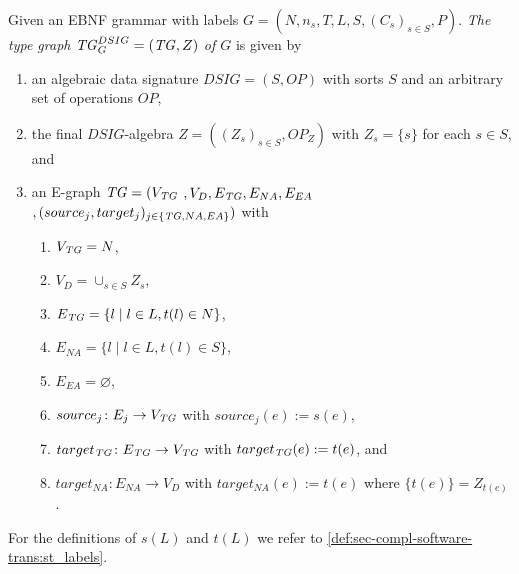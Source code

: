\begin{definition}
\label{def:sec-compl-software-trans:ebnf_typegraph}
Given an EBNF grammar with labels $G=(N,n_s,T,L,S,(C_s)_{s \in S},P)$.
\emph{The type graph $\mathit{TG}_G^{DSIG}=(\mathit{TG},Z)$ of $G$} is given by
\begin{enumerate}
  \item an algebraic data signature $DSIG=(S,OP)$ with sorts $S$ and an arbitrary set of operations $OP$,
  \item the final $DSIG$-algebra $Z=((Z_s)_{s \in S},OP_Z)$ with $Z_s=\{s\}$ for each $s \in S$, and
  \item an E-graph $\mathit{TG}=(V_{\mathit{TG}}$ $,V_D,E_{\mathit{TG}},E_{NA},E_{EA}$ $,(source_j,target_j)_{j \in \{\mathit{TG},NA,EA\}})$ with
  \begin{enumerate}
    \item $V_{\mathit{TG}}=N$,
    \item $V_D=\cup_{s \in S}Z_s$,
    \item \label{item:sec-compl-software-trans:ebnf_typegraph3}$E_{\mathit{TG}}=\{l \mid l \in L, t(l) \in N\}$,
    \item \label{item:sec-compl-software-trans:ebnf_typegraph4}$E_{NA}=\{l \mid l \in L, t(l) \in S\}$,
    \item $E_{EA}=\varnothing$,
    \item $source_j\colon E_j \to V_\mathit{TG}$ with $source_j(e):=s(e)$,
    \item $target_\mathit{TG}\colon E_\mathit{TG} \to V_\mathit{TG}$ with $target_\mathit{TG}(e):=t(e)$, and
    \item $target_{NA}\colon E_{NA} \to V_D$ with $target_{NA}(e):=t(e)$ where $\{t(e)\} = Z_{t(e)}$.
  \end{enumerate}
\end{enumerate}
For the definitions of $s(L)$ and $t(L)$ we refer to \cref{def:sec-compl-software-trans:st_labels}.
\envEndMarker
\end{definition}

